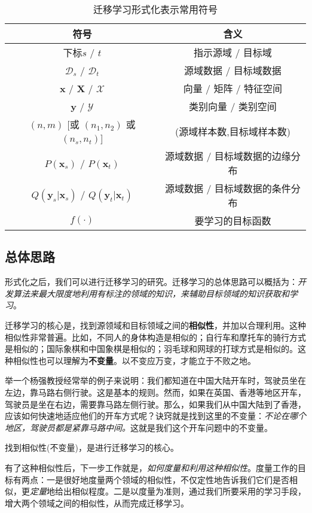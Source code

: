 \begin{table}[htbp]
	\centering
	\caption{迁移学习形式化表示常用符号}
	\label{tb-symbol}
	\begin{tabular}{|c|c|}
		\hline
		\textbf{符号} & \textbf{含义} \\ \hline
		下标$s$ / $t$ & 指示源域 / 目标域 \\ \hline
		$\mathcal{D}_s$ / $\mathcal{D}_t$ & 源域数据 / 目标域数据 \\ \hline
		$\mathbf{x}$ /  $\mathbf{X}$ / $\mathcal{X}$ & 向量 / 矩阵 / 特征空间 \\ \hline
		$\mathbf{y}$ / $\mathcal{Y}$ & 类别向量 / 类别空间 \\ \hline
		$(n,m)$ [或 $(n_1,n_2)$ 或 $(n_s,n_t)$] & (源域样本数,目标域样本数) \\ \hline
		$P(\mathbf{x}_s)$ / $P(\mathbf{x}_t)$ & 源域数据 / 目标域数据的边缘分布 \\ \hline
		$Q(\mathbf{y}_s | \mathbf{x}_s)$ / $Q(\mathbf{y}_t | \mathbf{x}_t)$ & 源域数据 / 目标域数据的条件分布 \\ \hline
		$f(\cdot)$ & 要学习的目标函数 \\ \hline
	\end{tabular}
\end{table}

\subsection{总体思路}

形式化之后，我们可以进行迁移学习的研究。迁移学习的总体思路可以概括为：\textit{开发算法来最大限度地利用有标注的领域的知识，来辅助目标领域的知识获取和学习}。

迁移学习的核心是，找到源领域和目标领域之间的\textbf{相似性}，并加以合理利用。这种相似性非常普遍。比如，不同人的身体构造是相似的；自行车和摩托车的骑行方式是相似的；国际象棋和中国象棋是相似的；羽毛球和网球的打球方式是相似的。这种相似性也可以理解为\textbf{不变量}。以不变应万变，才能立于不败之地。

举一个杨强教授经常举的例子来说明：我们都知道在中国大陆开车时，驾驶员坐在左边，靠马路右侧行驶。这是基本的规则。然而，如果在英国、香港等地区开车，驾驶员是坐在右边，需要靠马路左侧行驶。那么，如果我们从中国大陆到了香港，应该如何快速地适应他们的开车方式呢？诀窍就是找到这里的不变量：\textit{不论在哪个地区，驾驶员都是紧靠马路中间。}这就是我们这个开车问题中的不变量。

找到相似性(不变量)，是进行迁移学习的核心。

有了这种相似性后，下一步工作就是，\textit{如何度量和利用这种相似性}。度量工作的目标有两点：一是很好地度量两个领域的相似性，不仅定性地告诉我们它们是否相似，更\textit{定量}地给出相似程度。二是以度量为准则，通过我们所要采用的学习手段，增大两个领域之间的相似性，从而完成迁移学习。

